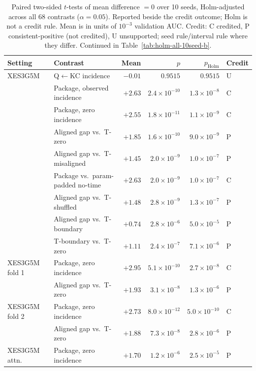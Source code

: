 \begin{table}[tbp]
\caption{Paired two-sided $t$-tests of mean difference $=0$ over 10
seeds, Holm-adjusted across all 68 contrasts ($\alpha=0.05$).
Reported beside the credit outcome; Holm is not a credit rule. Mean is
in units of $10^{-3}$ validation AUC. Credit: C credited, P consistent-positive (not credited), U unsupported; seed rule/interval rule where they differ. Continued in Table~\ref{tab:holm-all-10seed-b}.}
\label{tab:holm-all-10seed}
\centering
\scriptsize
\setlength{\tabcolsep}{3pt}
\renewcommand{\arraystretch}{0.84}
\begin{tabular}{@{}llrrrl@{}}
\toprule
Setting & Contrast & Mean & $p$ & $p_{\mathrm{Holm}}$ & Credit \\
\midrule
XES3G5M & Q$\leftarrow$KC incidence & $-0.01$ & $0.9515$ & $0.9515$ & U \\
 & Package, observed incidence & $+2.63$ & $2.4\times10^{-10}$ & $1.3\times10^{-8}$ & C \\
 & Package, zero incidence & $+2.55$ & $1.8\times10^{-11}$ & $1.1\times10^{-9}$ & C \\
 & Aligned gap vs.\ T-zero & $+1.85$ & $1.6\times10^{-10}$ & $9.0\times10^{-9}$ & P \\
 & Aligned gap vs.\ T-misaligned & $+1.45$ & $2.0\times10^{-9}$ & $1.0\times10^{-7}$ & P \\
 & Package vs.\ param-padded no-time & $+2.63$ & $2.0\times10^{-9}$ & $1.0\times10^{-7}$ & C \\
 & Aligned gap vs.\ T-shuffled & $+1.48$ & $2.8\times10^{-9}$ & $1.3\times10^{-7}$ & P \\
 & Aligned gap vs.\ T-boundary & $+0.74$ & $2.8\times10^{-6}$ & $5.0\times10^{-5}$ & P \\
 & T-boundary vs.\ T-zero & $+1.11$ & $2.4\times10^{-7}$ & $7.1\times10^{-6}$ & P \\
\addlinespace
XES3G5M fold 1 & Package, zero incidence & $+2.95$ & $5.1\times10^{-10}$ & $2.7\times10^{-8}$ & C \\
 & Aligned gap vs.\ T-zero & $+1.93$ & $3.1\times10^{-8}$ & $1.3\times10^{-6}$ & P \\
\addlinespace
XES3G5M fold 2 & Package, zero incidence & $+2.73$ & $8.0\times10^{-12}$ & $5.0\times10^{-10}$ & C \\
 & Aligned gap vs.\ T-zero & $+1.88$ & $7.3\times10^{-8}$ & $2.8\times10^{-6}$ & P \\
\addlinespace
XES3G5M attn. & Package, zero incidence & $+1.70$ & $1.2\times10^{-6}$ & $2.5\times10^{-5}$ & P \\

\end{tabular}
\end{table}
